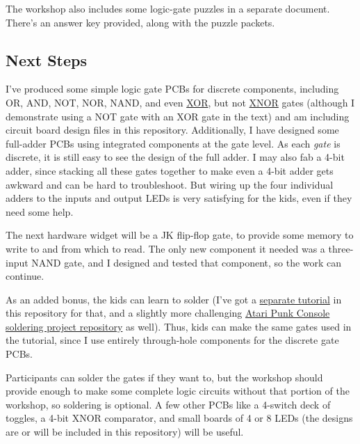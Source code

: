The workshop also includes some logic-gate puzzles in a separate document. There's an answer key provided, along with the puzzle packets.

\subsection*{Next Steps}

I've produced some simple logic gate PCBs for discrete components, including OR, AND, NOT, NOR, NAND, and even {\color{webblue}\href{https://en.wikipedia.org/wiki/XOR_gate}{XOR}}, but not {\color{webblue}\href{https://en.wikipedia.org/wiki/XNOR_gate}{XNOR}} gates (although I demonstrate using a NOT gate with an XOR gate in the text) and am including circuit board design files in this repository. Additionally, I have designed some full-adder PCBs using integrated components at the gate level. As each \emph{gate} is discrete, it is still easy to see the design of the full adder. I may also fab a 4-bit adder, since stacking all these gates together to make even a 4-bit adder gets awkward and can be hard to troubleshoot. But wiring up the four individual adders to the inputs and output LEDs is very satisfying for the kids, even if they need some help.

The next hardware widget will be a JK flip-flop gate, to provide some memory to write to and from which to read.
The only new component it needed was a three-input NAND gate, and I designed and tested that component, so the work can continue.

As an added bonus, the kids can learn to solder (I've got a {\color{webblue}\href{https://github.com/jessehamner/TechMillForKids/tree/master/soldering}{separate tutorial}} in this repository for that, and a slightly more challenging {\color{webblue}\href{https://github.com/jessehamner/AtariPunkConsole}{Atari Punk Console soldering project repository}} as well). Thus, kids can make the same gates used in the tutorial, since I use entirely through-hole components for the discrete gate PCBs. 

Participants can solder the gates if they want to, but the workshop should provide enough to make some complete logic circuits without that portion of the workshop, so soldering is optional. A few other PCBs like a 4-switch deck of toggles, a 4-bit XNOR comparator, and small boards of 4 or 8 LEDs (the designs are or will be included in this repository) will be  useful.
